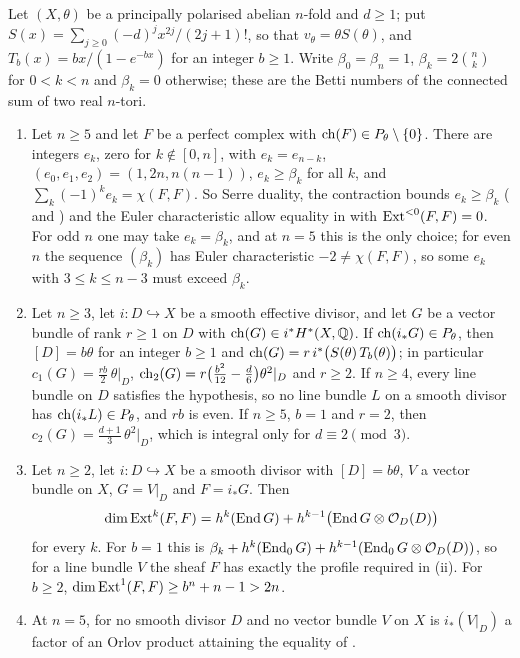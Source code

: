 \begin{proposition}
\label{prop:divisortemplate}
Let $(X,\theta)$ be a principally polarised abelian $n$-fold and $d\ge1$; put
$S(x)=\sum_{j\ge0}(-d)^{j}x^{2j}/(2j+1)!$, so that $v_{\theta}=\theta
S(\theta)$, and $T_{b}(x)=bx/(1-e^{-bx})$ for an integer $b\ge1$. Write
$\beta_{0}=\beta_{n}=1$, $\beta_{k}=2\binom{n}{k}$ for $0<k<n$ and
$\beta_{k}=0$ otherwise; these are the Betti numbers of the connected sum of
two real $n$-tori.
\begin{enumerate}[label=\textup{(\roman*)},leftmargin=2.6em,itemsep=2pt]
\item Let $n\ge5$ and let $F$ be a perfect complex with
  $\operatorname{ch}(F)\in P_{\theta}\setminus\{0\}$. There are integers $e_{k}$, zero for
  $k\notin[0,n]$, with $e_{k}=e_{n-k}$, $(e_{0},e_{1},e_{2})=(1,2n,n(n-1))$,
  $e_{k}\ge\beta_{k}$ for all $k$, and $\sum_{k}(-1)^{k}e_{k}=\chi(F,F)$. So
  Serre duality, the contraction bounds $e_{k}\ge\beta_{k}$
  ( and \cite{CRV12}) and the Euler
  characteristic allow equality in  with
  $\operatorname{Ext}^{<0}(F,F)=0$. For odd $n$ one may take $e_{k}=\beta_{k}$, and at $n=5$
  this is the only choice; for even $n$ the sequence $(\beta_{k})$ has Euler
  characteristic $-2\ne\chi(F,F)$, so some $e_{k}$ with $3\le k\le n-3$ must
  exceed $\beta_{k}$.
\item Let $n\ge3$, let $i\colon D\hookrightarrow X$ be a smooth effective
  divisor, and let $G$ be a vector bundle of rank $r\ge1$ on $D$ with
  $\operatorname{ch}(G)\in i^{*}H^{*}(X,\mathbb{Q})$. If $\operatorname{ch}(i_{*}G)\in P_{\theta}$, then
  $[D]=b\theta$ for an integer $b\ge1$ and
  $\operatorname{ch}(G)=r\,i^{*}\bigl(S(\theta)\,T_{b}(\theta)\bigr)$; in particular
  $c_{1}(G)=\frac{rb}{2}\,\theta|_{D}$,
  $\operatorname{ch}_{2}(G)=r\bigl(\frac{b^{2}}{12}-\frac{d}{6}\bigr)\theta^{2}|_{D}$ and
  $r\ge2$. If $n\ge4$, every line bundle on $D$ satisfies the hypothesis, so
  no line bundle $L$ on a smooth divisor has $\operatorname{ch}(i_{*}L)\in P_{\theta}$, and
  $rb$ is even. If $n\ge5$, $b=1$ and $r=2$, then
  $c_{2}(G)=\frac{d+1}{3}\,\theta^{2}|_{D}$, which is integral only for
  $d\equiv2\pmod3$.
\item Let $n\ge2$, let $i\colon D\hookrightarrow X$ be a smooth divisor with
  $[D]=b\theta$, $V$ a vector bundle on $X$, $G=V|_{D}$ and $F=i_{*}G$. Then
  \[
    \dim\operatorname{Ext}^{k}(F,F)=h^{k}(\operatorname{End} G)+h^{k-1}\bigl(\operatorname{End} G\otimes\mathcal{O}_{D}(D)\bigr)
  \]
  for every $k$. For $b=1$ this is
  $\beta_{k}+h^{k}(\operatorname{End}_{0}G)+h^{k-1}(\operatorname{End}_{0}G\otimes\mathcal{O}_{D}(D))$, so for a line
  bundle $V$ the sheaf $F$ has exactly the profile required in
  (ii). For $b\ge2$, $\dim\operatorname{Ext}^{1}(F,F)\ge
  b^{n}+n-1>2n$.
\item At $n=5$, for no smooth divisor $D$ and no vector bundle $V$ on $X$ is
  $i_{*}(V|_{D})$ a factor of an Orlov product attaining the equality of
  .
\end{enumerate}
\end{proposition}

